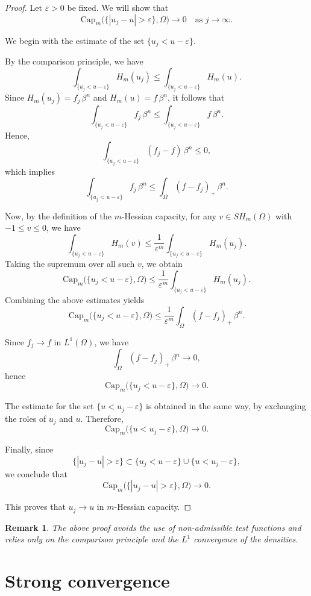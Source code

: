 \documentclass[10pt,a4paper]{amsart}
\newtheorem{remark}[theorem]{Remark}
\begin{document}
\begin{proof}
	Let $\varepsilon>0$ be fixed. We will show that
	\[
	\mathrm{Cap}_m\big(\{|u_j-u|>\varepsilon\},\Omega\big)\to 0
	\quad \text{as } j\to\infty.
	\]
	
	We begin with the estimate of the set $\{u_j<u-\varepsilon\}$.
	
	By the comparison principle, we have
	\[
	\int_{\{u_j<u-\varepsilon\}} H_m(u_j)
	\le
	\int_{\{u_j<u-\varepsilon\}} H_m(u).
	\]
	Since $H_m(u_j)=f_j\,\beta^n$ and $H_m(u)=f\,\beta^n$, it follows that
	\[
	\int_{\{u_j<u-\varepsilon\}} f_j\,\beta^n
	\le
	\int_{\{u_j<u-\varepsilon\}} f\,\beta^n.
	\]
	Hence,
	\[
	\int_{\{u_j<u-\varepsilon\}} (f_j-f)\,\beta^n \le 0,
	\]
	which implies
	\[
	\int_{\{u_j<u-\varepsilon\}} f_j\,\beta^n
	\le
	\int_\Omega (f-f_j)_+\,\beta^n.
	\]
	
	Now, by the definition of the $m$-Hessian capacity, for any
	$v\in SH_m(\Omega)$ with $-1\le v\le 0$, we have
	\[
	\int_{\{u_j<u-\varepsilon\}} H_m(v)
	\le
	\frac{1}{\varepsilon^m}
	\int_{\{u_j<u-\varepsilon\}} H_m(u_j).
	\]
	Taking the supremum over all such $v$, we obtain
	\[
	\mathrm{Cap}_m\big(\{u_j<u-\varepsilon\},\Omega\big)
	\le
	\frac{1}{\varepsilon^m}
	\int_{\{u_j<u-\varepsilon\}} H_m(u_j).
	\]
	Combining the above estimates yields
	\[
	\mathrm{Cap}_m\big(\{u_j<u-\varepsilon\},\Omega\big)
	\le
	\frac{1}{\varepsilon^m}
	\int_\Omega (f-f_j)_+\,\beta^n.
	\]
	
	Since $f_j\to f$ in $L^1(\Omega)$, we have
	\[
	\int_\Omega (f-f_j)_+\,\beta^n \longrightarrow 0,
	\]
	hence
	\[
	\mathrm{Cap}_m\big(\{u_j<u-\varepsilon\},\Omega\big)\to 0.
	\]
	
	The estimate for the set $\{u<u_j-\varepsilon\}$ is obtained in the same way, by exchanging the roles of $u_j$ and $u$. Therefore,
	\[
	\mathrm{Cap}_m\big(\{u<u_j-\varepsilon\},\Omega\big)\to 0.
	\]
	
	Finally, since
	\[
	\{|u_j-u|>\varepsilon\}
	\subset
	\{u_j<u-\varepsilon\}\cup \{u<u_j-\varepsilon\},
	\]
	we conclude that
	\[
	\mathrm{Cap}_m\big(\{|u_j-u|>\varepsilon\},\Omega\big)\to 0.
	\]
	
	This proves that $u_j\to u$ in $m$-Hessian capacity.
\end{proof}
\begin{remark}
	The above proof avoids the use of non-admissible test functions 
	and relies only on the comparison principle and the $L^1$ convergence 
	of the densities.
\end{remark}
	\section{Strong convergence}
	
\end{document}
